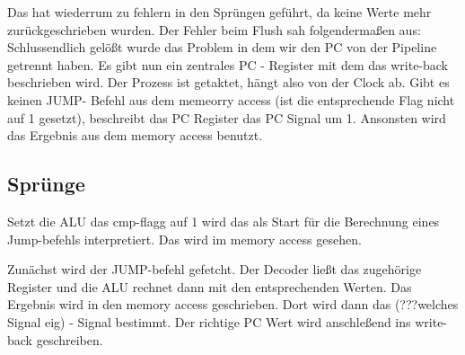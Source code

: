 \documentclass[paper=a4,fontsize=12pt,twocolumn]{scrreprt}
\begin{document}
Das hat wiederrum zu fehlern in den Sprüngen geführt, da keine Werte mehr zurückgeschrieben wurden. Der Fehler beim Flush sah folgendermaßen aus: 
Schlussendlich gelößt wurde das Problem in dem wir den PC von der Pipeline getrennt haben. Es gibt nun ein zentrales PC - Register mit dem das write-back beschrieben wird. Der Prozess ist getaktet, hängt also von der Clock ab. Gibt es keinen JUMP- Befehl aus dem memeorry access (ist die entsprechende Flag nicht auf 1 gesetzt), beschreibt das PC Register das PC Signal um 1. Ansonsten wird das Ergebnis aus dem memory access benutzt. 



\subsection{Sprünge}
Setzt die ALU das cmp-flagg auf 1 wird das als Start für die Berechnung eines Jump-befehls interpretiert. Das wird im memory access gesehen. 

Zunächst wird der JUMP-befehl gefetcht. Der Decoder ließt das zugehörige Register und die ALU rechnet dann mit den entsprechenden Werten. Das Ergebnis wird in den memory access geschrieben. Dort wird dann das (???welches Signal eig) - Signal bestimmt. Der richtige PC Wert wird anschleßend ins write-back geschreiben. 


\end{document}
